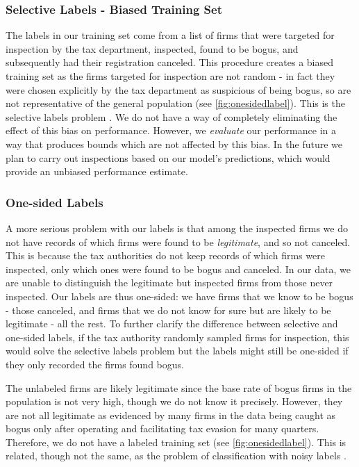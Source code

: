 \subsubsection{Selective Labels - Biased Training Set}
\label{subsubsec:biased-training-set} 
The labels in our training set come from a list of firms that were targeted for inspection by the tax department, inspected, found to be bogus, and subsequently had their registration canceled. This procedure creates a biased training set as the firms targeted for inspection are not random - in fact they were chosen explicitly by the tax department as suspicious of being bogus, so are not representative of the general population (see \cref{fig:onesidedlabel}). This is the selective labels problem \cite{lakkaraju2017selective}.  We do not have a way of completely eliminating the effect of this bias on performance. However, we \textit{evaluate} our performance in a way that produces bounds which are not affected by this bias. In the future we plan to carry out inspections based on our model's predictions, which would provide an unbiased performance estimate.

\subsubsection{One-sided Labels}
\label{subsubsec:one-sided-labels} 
A more serious problem with our labels is that among the inspected firms we do not have records of which firms were found to be \textit{legitimate}, and so not canceled. This is because the tax authorities do not keep records of which firms were inspected, only which ones were found to be bogus and canceled. In our data, we are unable to distinguish the legitimate but inspected firms from those never inspected. Our labels are thus one-sided: we have firms that we know to be bogus - those canceled, and firms that we do not know for sure but are likely to be legitimate - all the rest. To further clarify the difference between selective and one-sided labels, if the tax authority randomly sampled firms for inspection, this would solve the selective labels problem but the labels might still be one-sided if they only recorded the firms found bogus.

The unlabeled firms are likely legitimate since the base rate of bogus firms in the population is not very high, though we do not know it precisely. However, they are not all legitimate as evidenced by many firms in the data being caught as bogus only after operating and facilitating tax evasion for many quarters. Therefore, we do not have a labeled training set (see \cref{fig:onesidedlabel}). This is related, though not the same, as the problem of classification with noisy labels \cite{liu2016classification, natarajan2013learning}.

